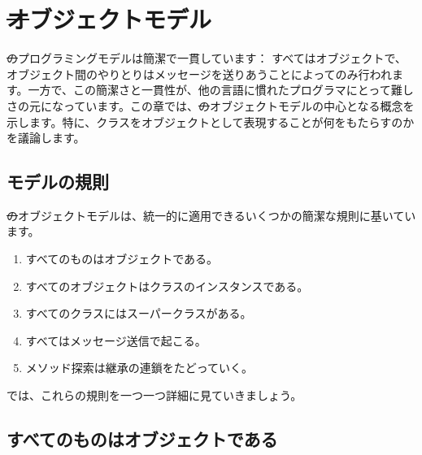 \documentclass[a4paper,10pt,twoside]{book}
\begin{document}
	\renewcommand{\nnbb}[2]{} %
	\sloppy
\fi
\chapter{\st オブジェクトモデル}

\st のプログラミングモデルは簡潔で一貫しています： すべてはオブジェクトで、オブジェクト間のやりとりはメッセージを送りあうことによってのみ行われます。一方で、この簡潔さと一貫性が、他の言語に慣れたプログラマにとって難しさの元になっています。この章では、\st のオブジェクトモデルの中心となる概念を示します。特に、クラスをオブジェクトとして表現することが何をもたらすのかを議論します。

\section{モデルの規則}

\st のオブジェクトモデルは、統一的に適用できるいくつかの簡潔な規則に基いています。

\begin{enumerate}[label={\textbf{Rule \arabic{*}}.}, ref={Rule \arabic{*}}, leftmargin=*]
\item{} 
	すべてのものはオブジェクトである。

\item{} 
	すべてのオブジェクトはクラスのインスタンスである。

\item{}  
	すべてのクラスにはスーパークラスがある。

\item{}  
	すべてはメッセージ送信で起こる。

\item{}  
	メソッド探索は継承の連鎖をたどっていく。

\end{enumerate}

\noindent
では、これらの規則を一つ一つ詳細に見ていきましょう。


\section{すべてのものはオブジェクトである}
\end{document}
